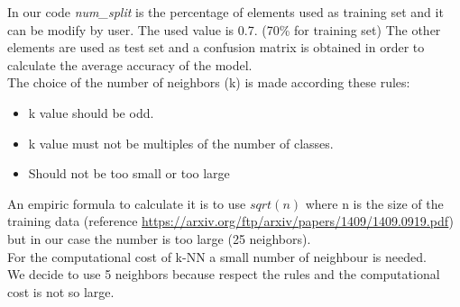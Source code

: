 \documentclass[12pt]{article} %
\begin{document}
\begin{figure}[H] %
\end{figure}
In our code \textit{num\_split} is the percentage of elements used as training set and it can be modify by user. The used value is 0.7. (70\% for training set)
The other elements are used as test set and a confusion matrix is obtained in order to calculate the average accuracy of the model.\\  

The choice of the number of neighbors (k) is made according these rules:
\begin{itemize}
\item  k value should be odd.
\item  k value must not be multiples of the number of classes.
\item  Should not be too small or too large
\end{itemize}
An empiric formula to calculate it is to use $sqrt(n)$ where n is the size of the training data (reference \url{https://arxiv.org/ftp/arxiv/papers/1409/1409.0919.pdf}) but in our case the number is too large (25 neighbors).\\
For the computational cost of k-NN a small number of neighbour is needed.\\
We decide to use 5 neighbors because respect the rules and the computational cost is not so large. 
\end{document}

